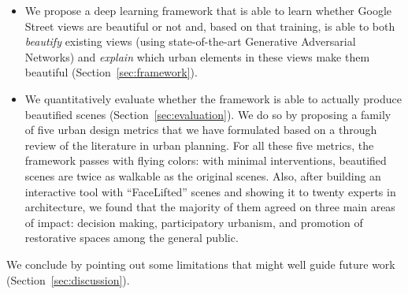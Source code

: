 \begin{itemize}
\item We propose a deep learning framework that is able to learn whether Google Street views are beautiful or not and, based on that training, is able to both \emph{beautify} existing views (using state-of-the-art Generative Adversarial Networks)  and \emph{explain} which urban elements in these views make them  beautiful (Section~\ref{sec:framework}). 

\item We quantitatively evaluate whether the framework is able to actually produce beautified scenes (Section~\ref{sec:evaluation}). We do so by proposing a family of five urban design metrics that we have formulated based on a through review of the literature in urban planning. For all these five metrics, the framework passes with flying colors: with minimal interventions, beautified scenes are twice as walkable as the original scenes. Also, after building an interactive tool with ``FaceLifted'' scenes and showing it to twenty experts in architecture,  we found that the majority of them agreed on three main areas of impact: decision making, participatory urbanism, and promotion of restorative spaces among the general public. 

\end{itemize}

We conclude by pointing out some limitations that might well guide future work (Section~\ref{sec:discussion}).








